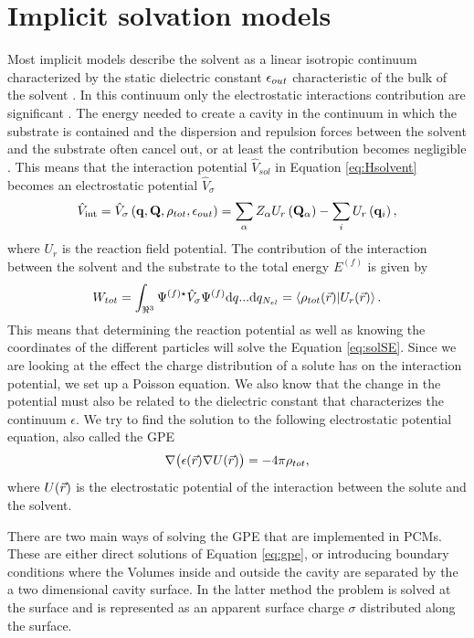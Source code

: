 \documentclass[../Thesis.tex]{subfiles}
\begin{document}
\section{Implicit solvation models}
Most implicit models describe the solvent as a linear isotropic continuum
characterized by the static dielectric constant $\epsilon_{out}$ characteristic
of the bulk of the solvent \cite{Tomasi:1994wt, FossoTande:2013ka}. In this continuum
only the electrostatic interactions contribution are significant \cite{Tomasi:1994wt}.
The energy needed to create a cavity in the continuum in which the substrate is
contained and the dispersion and repulsion forces between the solvent and the
substrate often cancel out, or at least the contribution becomes negligible
\cite{Cramer:2004}. This means that the interaction potential $\hat{V}_{sol}$
in Equation \ref{eq:Hsolvent} becomes an electrostatic potential $\hat{V}_{\sigma}$
\cite{Tomasi:1994wt}
\begin{equation}
  \hat{V}_{\mathrm{int}}=\hat{V}_{\sigma}\left(\mathbf{q}, \mathbf{Q},
  \rho_{tot}, \epsilon_{out}\right)=\sum_{\alpha} Z_{\alpha} U_r
  \left(\mathbf{Q}_{\alpha}\right)-\sum_{i} U_r\left(\mathbf{q}_{i}\right),
\end{equation}
where $U_r$ is the reaction field potential.
The contribution of the interaction between the solvent and the substrate to the total energy
$E^{(f)}$ is given by
\begin{equation}
  W_{tot} = \int_{\real^3}\Psi^{(f)\star}\hat{V}_{\sigma}\Psi^{(f)}\text{d}q...\text{d}q_{N_{el}}
  = \braket{\rho_{tot}(\rvec)|U_r(\rvec)}.
\end{equation}
This means that determining the reaction potential as well as knowing the coordinates
of the different particles will solve the Equation \ref{eq:solSE}.
Since we are looking at the effect the charge distribution of a solute has on
the interaction potential, we set up a Poisson equation. We also know that the change in
the potential must also be related to the dielectric constant that characterizes
the continuum $\epsilon$. We try to find the solution to the following
electrostatic potential equation, also called the \ac{GPE}
\begin{equation}\label{eq:gpe}
  \nabla\big( \epsilon(\vec{r}) \nabla U(\vec{r})\big) = -4\pi\rho_{tot},
\end{equation}
where $U(\vec{r})$ is the electrostatic potential of the interaction between
the solute and the solvent.

There are two main ways of solving the \ac{GPE} that are implemented in \acp{PCM}.
These are either direct solutions of Equation \ref{eq:gpe}, or introducing boundary conditions
where the Volumes inside and outside the cavity are separated by the a two dimensional
cavity surface. In the latter method the problem is solved at the surface and is represented
as an apparent surface charge $\sigma$ distributed along the surface.
\end{document}
